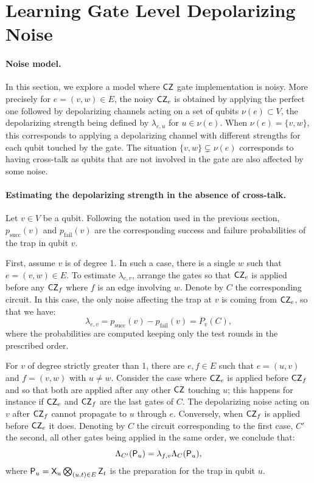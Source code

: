 \section{Learning Gate Level Depolarizing Noise}\label{sec:Depnoise}

\paragraph{Noise model.}
In this section, we explore a model where \(\mathsf{CZ}\) gate implementation is noisy. More precisely for \(e = (v,w) \in E\), the noisy \(\mathsf{CZ}_{e}\) is obtained by applying the perfect one followed by depolarizing channels acting on a set of qubits \(\nu(e) \subset V\), the depolarizing strength being defined by \(\lambda_{e,u}\) for $u\in \nu(e)$. When \(\nu(e) = \{v,w\}\), this corresponds to applying a depolarizing channel with different strengths for each qubit touched by the gate. The situation \(\{v,w\}  \subsetneq \nu(e)\) corresponds to having cross-talk as qubits that are not involved in the gate are also affected by some noise.

\paragraph{Estimating the depolarizing strength in the absence of cross-talk.}
Let \(v \in V\) be a qubit. Following the notation used in the previous section, \(p_{\mathrm{succ}}(v)\) and \(p_{\mathrm{fail}}(v)\) are the corresponding success and failure probabilities of the trap in qubit \(v\).

First,  assume \(v\) is of degree 1. In such a case, there is a single \(w\) such that \(e =  (v,w) \in E\). To estimate \(\lambda_{e,v}\), arrange the gates so that \(\mathsf{CZ}_e\) is applied before any \(\mathsf{CZ}_f\) where \(f\) is an edge involving \(w\). Denote by $C$ the corresponding circuit. In this case, the only noise affecting the trap at \(v\) is coming from \(\mathsf{CZ}_e\), so that we have:
\begin{equation}
\lambda_{e,v} = p_{\mathrm{succ}}(v) - p_{\mathrm{fail}}(v) = P_v(C),
\end{equation}
where the probabilities are computed keeping only the test rounds in the prescribed order.

For \(v\) of degree strictly greater than 1, there are \(e,f \in E\) such that \(e = (u,v)\) and \(f = (v,w)\) with \(u \neq w\). Consider the case where \(\mathsf{CZ}_e\) is applied before \(\mathsf{CZ}_f\) and so that both are applied after any  other \(\mathsf{CZ}\) touching \(u\); this happens for instance if \(\mathsf{CZ}_e\) and \(\mathsf{CZ}_f\) are the last gates of \(C\).  The depolarizing noise acting on \(v\) after \(\mathsf{CZ}_{f}\) cannot propagate to \(u\) through \(e\). Conversely, when \(\mathsf{CZ}_f\) is applied before \(\mathsf{CZ}_e\) it does. Denoting by $C$ the circuit corresponding to the first case, \(C'\) the second, all other gates being applied in the same order, we conclude that:
\begin{equation}
\Lambda_{C'}(\mathsf{P}_u) = \lambda_{f,v}\Lambda_{C}(\mathsf{P}_u), 
\end{equation}
where \(\mathsf{P}_u = \mathsf{X}_u \bigotimes_{(u,t)\in E} \mathsf{Z}_t\) is the preparation for the trap in qubit \(u\).

